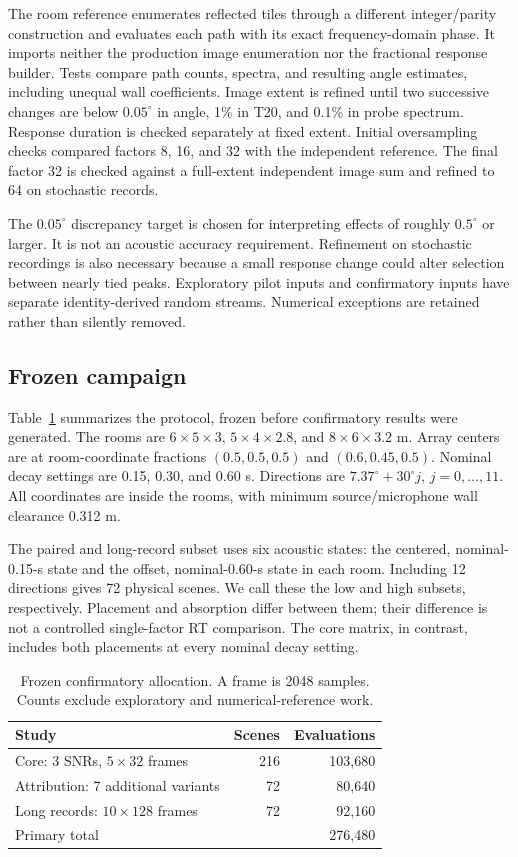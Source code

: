 \documentclass[10pt,a4paper,twocolumn]{article}
\begin{document}
The room reference enumerates reflected tiles through a different integer/parity construction and evaluates each path with its exact frequency-domain phase. It imports neither the production image enumeration nor the fractional response builder. Tests compare path counts, spectra, and resulting angle estimates, including unequal wall coefficients. Image extent is refined until two successive changes are below $0.05^\circ$ in angle, 1\% in T20, and 0.1\% in probe spectrum. Response duration is checked separately at fixed extent. Initial oversampling checks compared factors 8, 16, and 32 with the independent reference. The final factor 32 is checked against a full-extent independent image sum and refined to 64 on stochastic records.

The $0.05^\circ$ discrepancy target is chosen for interpreting effects of roughly $0.5^\circ$ or larger. It is not an acoustic accuracy requirement. Refinement on stochastic recordings is also necessary because a small response change could alter selection between nearly tied peaks. Exploratory pilot inputs and confirmatory inputs have separate identity-derived random streams. Numerical exceptions are retained rather than silently removed.

\subsection{Frozen campaign}
Table~\ref{tab:protocol} summarizes the protocol, frozen before confirmatory results were generated. The rooms are $6\times5\times3$, $5\times4\times2.8$, and $8\times6\times3.2$ m. Array centers are at room-coordinate fractions $(0.5,0.5,0.5)$ and $(0.6,0.45,0.5)$. Nominal decay settings are 0.15, 0.30, and 0.60 s. Directions are $7.37^\circ+30^\circ j$, $j=0,\ldots,11$. All coordinates are inside the rooms, with minimum source/microphone wall clearance 0.312 m.

The paired and long-record subset uses six acoustic states: the centered, nominal-0.15-s state and the offset, nominal-0.60-s state in each room. Including 12 directions gives 72 physical scenes. We call these the low and high subsets, respectively. Placement and absorption differ between them; their difference is not a controlled single-factor RT comparison. The core matrix, in contrast, includes both placements at every nominal decay setting.

\begin{table}[t]
\centering\small
\caption{Frozen confirmatory allocation. A frame is 2048 samples. Counts exclude exploratory and numerical-reference work.}
\label{tab:protocol}
\begin{tabular}{@{}lrr@{}}\toprule
Study & Scenes & Evaluations\\\midrule
Core: 3 SNRs, $5\times32$ frames & 216 & 103,680\\
Attribution: 7 additional variants & 72 & 80,640\\
Long records: $10\times128$ frames & 72 & 92,160\\\midrule
Primary total & & 276,480\\\bottomrule
\end{tabular}
\end{table}
\end{document}
